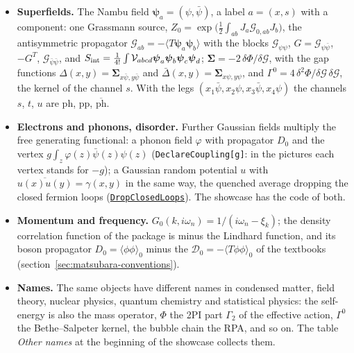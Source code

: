 \documentclass[11pt,a4paper]{article}
\newcommand{\pkg}[1]{\texttt{#1}}
\newcommand{\phbar}{\overline{\mathrm{ph}}}
\newcommand{\ph}{\mathrm{ph}}
\newcommand{\pp}{\mathrm{pp}}
\newcommand{\fnref}[1]{\hyperref[fn:#1]{\pkg{#1}}}
\begin{document}
\begin{itemize}
  $\Sigma=-2\,\delta\Phi/\delta G$ ($\Phi$ the 2PI part $\Gamma_2$ of the effective action), $F=\Gamma^{(4)}$.
\item \textbf{Superfields.} The Nambu field $\boldsymbol\psi_a=(\psi,\bar\psi)$, a label $a=(x,s)$ with a component: one
  Grassmann source, $Z_0=\exp\bigl(\frac12\int_{ab}J_a\mathcal G_{0,ab}J_b\bigr)$, the antisymmetric propagator $\mathcal G_{ab}=-\langle
  T\boldsymbol\psi_a\boldsymbol\psi_b\rangle$ with the blocks $\mathcal G_{\psi\psi}$, $G=\mathcal G_{\psi\bar\psi}$, $-G^T$, $\mathcal G_{\bar\psi\bar\psi}$, and
  $S_{\rm int}=\frac1{4!}\int\mathcal V_{abcd}\boldsymbol\psi_a\boldsymbol\psi_b\boldsymbol\psi_c\boldsymbol\psi_d$; $\boldsymbol\Sigma=-2\,\delta\Phi/\delta\mathcal G$,
  with the gap functions $\Delta(x,y)=\boldsymbol\Sigma_{x\bar\psi,y\bar\psi}$ and $\bar\Delta(x,y)=\boldsymbol\Sigma_{x\psi,y\psi}$, and
  $\Gamma^0=4\,\delta^2\Phi/\delta\mathcal G\,\delta\mathcal G$, the kernel of the channel $s$. With the legs $(x_1\bar\psi,x_2\psi,x_3\bar\psi,x_4\psi)$
  the channels $s$, $t$, $u$ are $\ph$, $\pp$, $\phbar$.
\item \textbf{Electrons and phonons, disorder.} Further Gaussian fields multiply the free generating functional: a
  phonon field $\varphi$ with propagator $D_0$ and the vertex $g\int_z\varphi(z)\bar\psi(z)\psi(z)$ (\pkg{DeclareCoupling[g]}: in the
  pictures each vertex stands for $-g$); a Gaussian random
  potential $u$ with $\overline{u(x)u(y)}=\gamma(x,y)$ in the same way, the quenched average dropping the closed fermion
  loops (\fnref{DropClosedLoops}). The showcase has the code of both.
\item \textbf{Momentum and frequency.} $G_0(k,i\omega_n)=1/(i\omega_n-\xi_k)$; the density correlation function of the
  package is minus the Lindhard function, and its boson propagator $D_0=\langle\phi\phi\rangle_0$ minus the
  $\mathcal D_0=-\langle T\phi\phi\rangle_0$ of the textbooks (section~\ref{sec:matsubara-conventions}).
\item \textbf{Names.} The same objects have different names in condensed matter, field theory, nuclear physics, quantum
  chemistry and statistical physics: the self-energy is also the mass operator, $\Phi$ the 2PI part $\Gamma_2$ of the
  effective action, $\Gamma^0$ the Bethe--Salpeter kernel, the bubble chain the RPA, and so on. The table \emph{Other names} at the
  beginning of the showcase collects them.
\end{itemize}

\end{document}
